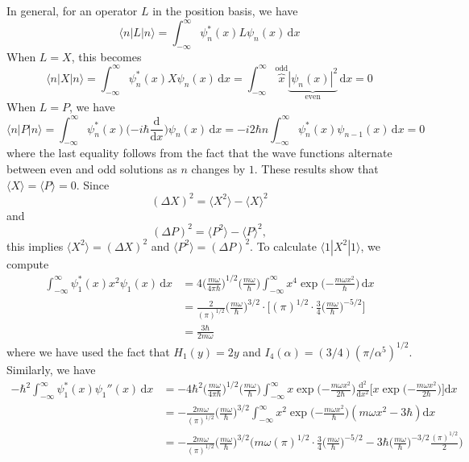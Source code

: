 \documentclass[../principles-of-quantum-mechanics.tex]{subfiles}
\begin{document}
\begin{questions}
		\begin{solution}
			In general, for an operator $L$ in the position basis, we have
			$$\langle n| L |n\rangle = \int_{-\infty}^{\infty}\psi_n^*(x) L \psi_n(x)\,\mathrm{d}x$$
			When $L = X$, this becomes
			$$\langle n |X|n\rangle = \int_{-\infty}^{\infty}\psi_n^*(x)X\psi_n(x)\,\mathrm{d}x = \int_{-\infty}^{\infty}\overbrace{x}^{\text{odd}}\underbrace{|\psi_n(x)|^2}_{\text{even}}\,\mathrm{d}x = 0$$
			When $L = P$, we have
			$$\langle n | P |n\rangle = \int_{-\infty}^{\infty}\psi_n^*(x)\Big({-i\hbar\frac{\mathrm{d}}{\mathrm{d}x}}\Big)\psi_n(x)\,\mathrm{d}x = -i2\hbar n\int_{-\infty}^{\infty}\psi_n^*(x)\psi_{n-1}(x)\,\mathrm{d}x = 0$$
			where the last equality follows from the fact that the wave functions alternate between even and odd solutions as $n$ changes by $1$. These results show that $\langle X \rangle = \langle P \rangle = 0$. Since
			$$(\Delta X)^2 = \langle X^2\rangle - \langle X\rangle^2$$
			and
			$$(\Delta P)^2 = \langle P^2\rangle - \langle P\rangle ^2,$$
			this implies $\langle X^2\rangle = (\Delta X)^2$ and $\langle P^2\rangle = (\Delta P)^2$. To calculate $\langle 1| X^2|1 \rangle$, we compute
			\begin{align*}
				\int_{-\infty}^{\infty}\psi_1^*(x)x^2\psi_1(x)\,\mathrm{d}x &= 4\Big(\frac{m\omega}{4\pi\hbar}\Big)^{1/2}\Big(\frac{m\omega}{\hbar}\Big)\int_{-\infty}^{\infty}x^4\exp\Big({-\frac{m\omega x^2}{\hbar}}\Big)\,\mathrm{d}x \\
				&= \frac{2}{(\pi)^{1/2}}\Big(\frac{m\omega}{\hbar}\Big)^{3/2}\cdot\Big[(\pi)^{1/2}\cdot\frac{3}{4}\Big(\frac{m\omega}{\hbar}\Big)^{-5/2}\Big] \\
				&= \frac{3\hbar}{2m\omega}
			\end{align*}
			where we have used the fact that $H_1(y) = 2y$ and $I_4(\alpha) = (3/4)(\pi/\alpha^5)^{1/2}$. Similarly, we have
			\begin{align*}
				-\hbar^2\int_{-\infty}^{\infty}\psi_1^*(x)\psi_1''(x)\,\mathrm{d}x &= -4\hbar^2\Big(\frac{m\omega}{4\pi\hbar}\Big)^{1/2}\Big(\frac{m\omega}{\hbar}\Big)\int_{-\infty}^{\infty}x\exp\Big({-\frac{m\omega x^2}{2\hbar}}\Big)\frac{\mathrm{d}^2}{\mathrm{d}x^2}\Big[x\exp\Big({-\frac{m\omega x^2}{2\hbar}}\Big)\Big]\mathrm{d}x \\
				&= -\frac{2m\omega}{(\pi)^{1/2}}\Big(\frac{m\omega}{\hbar}\Big)^{3/2}\int_{-\infty}^{\infty}x^2\exp\Big({-\frac{m\omega x^2}{\hbar}}\Big)(m\omega x^2 - 3\hbar)\mathrm{d}x \\
				&= -\frac{2m\omega}{(\pi)^{1/2}}\Big(\frac{m\omega}{\hbar}\Big)^{3/2}\Big(m\omega(\pi)^{1/2}\cdot\frac{3}{4}\Big(\frac{m\omega}{\hbar}\Big)^{-5/2} - 3\hbar\Big(\frac{m\omega}{\hbar}\Big)^{-3/2}\frac{(\pi)^{1/2}}{2}\Big) \\

\end{align*}
\end{solution}
\end{questions}
\end{document}
